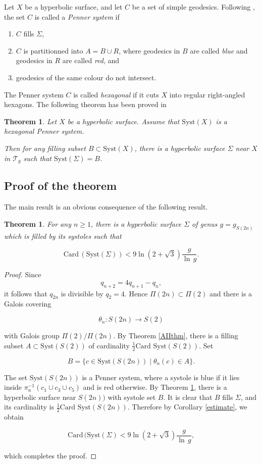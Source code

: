 \documentclass[12pt]{amsart}
\newcommand{\Card}{\mathrm{Card\,}}
\newcommand{\Syst}{{\mathrm {Syst}}}
\newtheorem{thm}[lemma]{Theorem}
\newcommand{\cT}{\mathcal{T}}
\begin{document}
Let $X$ be a hyperbolic surface, and let $C$ be a set of simple geodesics. Following \cite{Penner},
the set $C$ is called a {\it Penner system} if 
 
\begin{enumerate}
\item[(a)] $C$ fills $\Sigma$, 
\item[(b)] $C$ is partitionned into $A=B\cup R$, where geodesics in $B$ are called {\it blue}
and geodesics in $R$ are called {\it red}, and 
\item[(c)] geodesics of the same colour do not intersect.
\end{enumerate}

The Penner system $C$ is called {\it hexagonal} if it cuts $X$ into regular right-angled
hexagons. The following theorem has been proved in \cite{Mathieu}


\begin{thm}\label{Mat} Let $X$ be a hyperbolic surface. Assume that $\Syst(X)$ is a hexagonal 
Penner system.

Then for any filling subset $B\subset \Syst(X)$, there is a hyperbolic surface
$\Sigma$ near $X$ in $\cT_g$ such that $\Syst(\Sigma)=B$.
\end{thm}



\subsection{Proof of the theorem}

The main result is an obvious consequence of the following
result.


\begin{thm} For any $n\geq 1$, there is a hyperbolic surface 
$\Sigma$ of genus $g=g_{S(2n)}$ which is filled by its systoles such that

$$\Card(\Syst(\Sigma))<9\ln(2+\sqrt{3})\frac{g}{\ln\,g}.$$
\end{thm}

\begin{proof} Since
$$q_{n+2}=4 q_{n+1}-q_n,$$
it follows  that $q_{2n}$ is divisible by $q_2=4$. Hence 
$\Pi(2n)\subset \Pi(2)$ and there is a Galois covering

$$\theta_n: S(2n)\to S(2)$$

\noindent with Galois group $\Pi(2)/\Pi(2n)$. By Theorem \ref{AIIthm},
there is a filling subset $A\subset \Syst(S(2))$ of cardinality
$\frac{1}{2} \Card \,\Syst(S(2))$. Set

$$B=\{c\in\Syst(S(2n))\mid \theta_n(c)\in A\}.$$

The set $\Syst(S(2n))$ is a Penner system, where a systole is blue if it lies  inside $\pi_n^{-1}(c_1\cup c_3\cup c_5)$ and  is red otherwise.
By Theorem \ref{Mat}, there is a hyperbolic surface near $S(2n))$ with systole set
$B$. It is clear that $B$ fills $\Sigma$, and its cardinality is
$\frac{1}{2} \Card \,\Syst(S(2n))$. Therefore by Corollary \ref{estimate}, we obtain

$$\Card(\Syst(\Sigma)<9\ln(2+\sqrt{3})\frac{g}{\ln\,g},$$

\noindent which completes the proof.
\end{proof}
\end{document}
